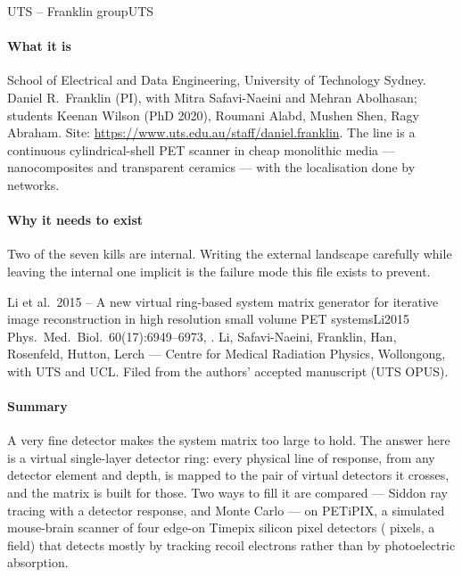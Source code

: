 \begin{programnote}{UTS -- Franklin group}{UTS}

\paragraph{What it is}
School of Electrical and Data Engineering, University of Technology Sydney.
Daniel R.\ Franklin (PI), with Mitra Safavi-Naeini and Mehran Abolhasan;
students Keenan Wilson (PhD 2020), Roumani Alabd, Mushen Shen, Ragy Abraham.
Site: \url{https://www.uts.edu.au/staff/daniel.franklin}. The line is a
continuous cylindrical-shell PET scanner in cheap monolithic media ---
nanocomposites and transparent ceramics --- with the localisation done by
networks.

\paragraph{Why it needs to exist}
Two of the seven kills are internal. Writing the external landscape carefully
while leaving the internal one implicit is the failure mode this file exists to
prevent. 

\begin{papernote}{Li et al.\ 2015 -- A new virtual ring-based system matrix generator for iterative image reconstruction in high resolution small volume PET systems}{Li2015}
Phys.\ Med.\ Biol.\ 60(17):6949--6973, .
Li, Safavi-Naeini, Franklin, Han, Rosenfeld, Hutton, Lerch --- Centre for
Medical Radiation Physics, Wollongong, with UTS and UCL. Filed from the authors'
accepted manuscript (UTS OPUS).

\paragraph{Summary}
A very fine detector makes the system matrix too large to hold. The answer here
is a virtual single-layer detector ring: every physical line of response, from
any detector element and depth, is mapped to the pair of virtual detectors it
crosses, and the matrix is built for those. Two ways to fill it are compared ---
Siddon ray tracing with a detector response, and Monte Carlo --- on PETiPIX, a
simulated mouse-brain scanner of four edge-on Timepix silicon pixel detectors
( pixels, a  field) that detects mostly by tracking recoil
electrons rather than by photoelectric absorption.


\end{papernote}
\end{programnote}

